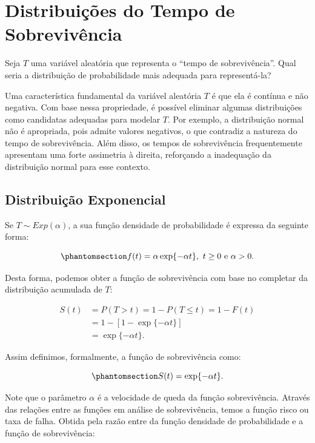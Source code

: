 \documentclass[
  12pt,
  letterpaper,
  DIV=11,
  numbers=noendperiod]{scrreprt}
\begin{document}
\section{Distribuições do Tempo de
Sobrevivência}\label{distribuiuxe7uxf5es-do-tempo-de-sobrevivuxeancia}

Seja \(T\) uma variável aleatória que representa o ``tempo de
sobrevivência''. Qual seria a distribuição de probabilidade mais
adequada para representá-la?

Uma característica fundamental da variável aleatória \(T\) é que ela é
contínua e não negativa. Com base nessa propriedade, é possível eliminar
algumas distribuições como candidatas adequadas para modelar \(T\). Por
exemplo, a distribuição normal não é apropriada, pois admite valores
negativos, o que contradiz a natureza do tempo de sobrevivência. Além
disso, os tempos de sobrevivência frequentemente apresentam uma forte
assimetria à direita, reforçando a inadequação da distribuição normal
para esse contexto.

\subsection{Distribuição Exponencial}\label{sec-DistExp}

Se \(T \sim Exp(\alpha)\), a sua função densidade de probabilidade é
expressa da seguinte forma:

\begin{equation}\phantomsection\label{eq-densitExp}{
f(t) = \alpha \exp\{ -\alpha t \}, \ t \geq 0 \ \text{e} \ \alpha > 0.
}\end{equation}

Desta forma, podemos obter a função de sobrevivência com base no
completar da distribuição acumulada de \(T\):

\begin{align*}
    S(t) & = P(T > t) = 1 - P(T \leq t) = 1 - F(t) \\
         & = 1 - [1 - \exp\{ -\alpha t \}] \\
         & = \exp\{ -\alpha t \}.
\end{align*}

Assim definimos, formalmente, a função de sobrevivência como:

\begin{equation}\phantomsection\label{eq-StExp}{
S(t) = \exp\{ -\alpha t \}.
}\end{equation}

Note que o parâmetro \(\alpha\) é a velocidade de queda da função
sobrevivência. Através das relações entre as funções em análise de
sobrevivência, temos a função risco ou taxa de falha. Obtida pela razão
entre da função densidade de probabilidade e a função de sobrevivência:
\end{document}
